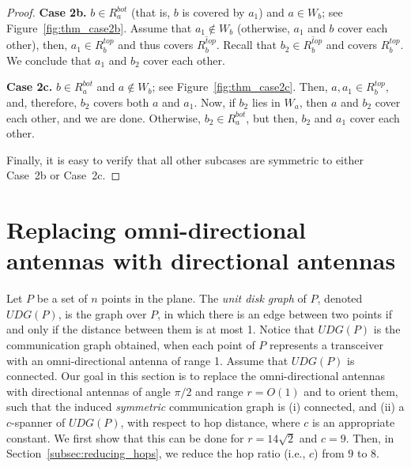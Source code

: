 \documentclass[11pt,letter]{article}
\newcommand{\old}[1]{{{}}}
\def\wedge#1{{W_{{#1}}}}
\def\topregion#1{{{R}^{top}_{{#1}}}}
\def\bottomregion#1{{{R}^{bot}_{{#1}}}}
\def\UDG{{U\!DG}}
\begin{document}
\begin{proof}
\old{
\begin{figure}[htp]
   \centering
       \texttt{[image: fig/thm\_figure7]}
   \caption{Proof of Theorem~\ref{thm:twosets} --- Case 2b.}
   \label{fig:thm_case2b}
\end{figure}
}

\noindent
{\bf Case 2b.} $b \in \bottomregion{a}$ (that is, $b$ is covered by $a_1$)
and $a \in \wedge{b}$; see Figure~\ref{fig:thm_case2b}.
Assume that $a_1 \notin \wedge{b}$ (otherwise, $a_1$ and $b$ cover each other),
then, $a_1 \in \topregion{b}$ and thus covers $\overline{\topregion{b}}$.
Recall that $b_2 \in \overline{\topregion{b}}$ and covers $\topregion{b}$.
We conclude that $a_1$ and $b_2$ cover each other.


\old{
\begin{figure}[htp]
   \centering
       \texttt{[image: fig/thm\_figure8]}
   \caption{Proof of Theorem~\ref{thm:twosets} --- Case 2c.}
   \label{fig:thm_case2c}
\end{figure}
}

\noindent
{\bf Case 2c.} $b \in \bottomregion{a}$ and $a \notin \wedge{b}$; see Figure~\ref{fig:thm_case2c}.
Then, $a, a_1 \in \topregion{b}$, and, therefore, $b_2$ covers both $a$ and $a_1$.
Now, if $b_2$ lies in $\wedge{a}$, then $a$ and $b_2$ cover each other, and we are done.
Otherwise, $b_2 \in \bottomregion{a}$, but then, $b_2$ and $a_1$ cover each other.

Finally, it is easy to verify that all other subcases are symmetric to either Case~2b or Case~2c.

\end{proof}



\section{Replacing omni-directional antennas with directional antennas}\label{sec:replacing_omni}

Let $P$ be a set of $n$ points in the plane. The {\em unit disk graph} of $P$, denoted $\UDG(P)$, is the graph over $P$, in which there is an edge between two points if and only if the distance between them is at most 1. Notice that $\UDG(P)$ is the communication graph obtained, when each point of $P$ represents a transceiver with an omni-directional antenna of range 1. Assume that $\UDG(P)$ is connected.
Our goal in this section is to replace the omni-directional antennas with directional antennas of angle $\pi/2$ and range $r=O(1)$ and to orient them, such that the induced {\em symmetric} communication graph is (i) connected, and (ii) a $c$-spanner of $\UDG(P)$, with respect to hop distance, where $c$ is an appropriate constant. We first show that this can be done for $r = 14 \sqrt 2$ and $c = 9$.
Then, in Section~\ref{subsec:reducing_hops}, we reduce the hop ratio (i.e., $c$) from $9$ to $8$.
\end{document}
